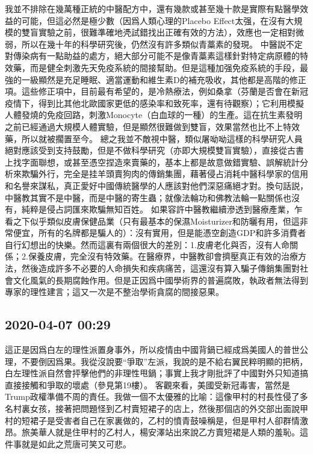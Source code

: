 \documentclass[twocolumn]{ctexart}
\begin{document}
我並不排除在幾萬種正統的中醫配方中，還有幾款或甚至幾十款是實際有點醫學效益的可能，但這必然是極少數（因爲人類心理的Placebo Effect太强，在沒有大規模的雙盲實驗之前，很難準確地凴試錯找出正確有效的方法），效應也一定相對微弱，所以在幾十年的科學研究後，仍然沒有許多類似青藁素的發現。
中醫説不定對傳染病有一點助益的處方，絕大部分可能不是像青藁素這樣針對特定病原體的特效藥，而是健全刺激先天免疫系統的間接幫助。但是這種加强免疫系統的手段，最強的一級顯然是充足睡眠、適當運動和維生素D的補充吸收，其他都是高階的修正項。這些修正項中，目前最有希望的，是冷熱療法，例如桑拿（芬蘭是否會在新冠疫情下，得到比其他北歐國家更低的感染率和致死率，還有待觀察）；它利用模擬人體發燒的免疫回路，刺激Monocyte（白血球的一種）的生產。這在抗生素發明之前已經通過大規模人體實驗，但是顯然很難做到雙盲，效果當然也比不上特效藥，所以就被擱置至今。
總之我並不敵視中醫，類似屠呦呦這樣的科學研究人員絕對應該受到支持鼓勵，但是不做科學研究（亦即大規模雙盲實驗），直接從古書上找字面聯想，或甚至憑空捏造來賣藥的，基本上都是故意做錯實驗、誤解統計分析來欺騙外行，完全是挂羊頭賣狗肉的傳銷集團，藉著侵占消耗中醫科學家的信用和名譽來謀私，真正愛好中國傳統醫學的人應該對他們深惡痛絕才對。換句話説，中醫教其實不是中醫，而是中醫的寄生蟲；就像法輪功和佛教法輪一點關係也沒有，純粹是侵占詞匯來欺騙無知百姓。
如果容許中醫教繼續滲透到醫療產業，乍看之下似乎類似皮膚保健品業（只有最基本的保濕Moisturizer和防曬有用，但這非常便宜，所有的名牌都是騙人的）：沒有實用，但是能憑空創造GDP和許多消費者自行幻想出的快樂。然而這裏有兩個很大的差別：1.皮膚老化與否，沒有人命關係；2.保養皮膚，完全沒有特效藥。在醫療界，中醫教卻會擠壓真正有效的治療方法，然後造成許多不必要的人命損失和疾病痛苦，這還沒有算入騙子傳銷集團對社會文化風氣的長期腐蝕作用。但是正因爲中國學術界的普遍腐敗，執政者無法得到專家的理性建言；這又一次是不整治學術貪腐的間接惡果。
\subsection*{2020-04-07 00:29}

這正是因爲白左的理性派置身事外，所以疫情由中國背鍋已經成爲美國人的普世公理，不要倒因爲果。我從沒說要“爭取”左派，我說的是不給右翼民粹明顯的把柄，白左理性派自然會抨擊他們的非理性甩鍋；事實上我才剛批評了中國對外只知道搞直接接觸和爭取的壞處（參見第19樓）。
客觀來看，美國受新冠毒害，當然是Trump政權準備不周的責任。我做一個不太優雅的比喻：這像甲村的村長性侵了多名村裏女孩，接著把問題怪到乙村賣短裙子的店上，然後那個店的外交部出面說甲村的短裙子是受害者自己在家裏做的，乙村的憤青鼓噪稱是，但是甲村人卻群情激昂。旅美華人就是住甲村的乙村人，楊安澤站出來說乙方賣短裙是人類的羞恥。這件事就是如此之荒唐可笑又可悲。
\end{document}
